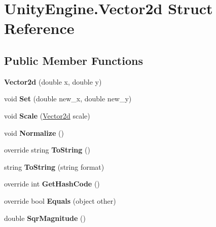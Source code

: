 \hypertarget{struct_unity_engine_1_1_vector2d}{}\section{Unity\+Engine.\+Vector2d Struct Reference}
\label{struct_unity_engine_1_1_vector2d}
\subsection*{Public Member Functions}
\begin{DoxyCompactItemize}
\item 
\mbox{\label{struct_unity_engine_1_1_vector2d_a04f770eca6bf089346578fbe02d2a85d}} 
{\bfseries Vector2d} (double x, double y)
\item 
\mbox{\label{struct_unity_engine_1_1_vector2d_a9d112a98ba6be5be962139b335bef50a}} 
void {\bfseries Set} (double new\+\_\+x, double new\+\_\+y)
\item 
\mbox{\label{struct_unity_engine_1_1_vector2d_a3cedcd488480122404c3571e151af24e}} 
void {\bfseries Scale} (\hyperlink{struct_unity_engine_1_1_vector2d}{Vector2d} scale)
\item 
\mbox{\label{struct_unity_engine_1_1_vector2d_ae1c2b2abc1d444137f3e427927919aee}} 
void {\bfseries Normalize} ()
\item 
\mbox{\label{struct_unity_engine_1_1_vector2d_a0e32225a9621ae1a91e11852b9dae864}} 
override string {\bfseries To\+String} ()
\item 
\mbox{\label{struct_unity_engine_1_1_vector2d_aaad542045077ef1699a3299a29848100}} 
string {\bfseries To\+String} (string format)
\item 
\mbox{\label{struct_unity_engine_1_1_vector2d_a936fb816c2313d3578248b643a9a1b8e}} 
override int {\bfseries Get\+Hash\+Code} ()
\item 
\mbox{\label{struct_unity_engine_1_1_vector2d_ac2d4ae49abb2a99ca46344e9bce0afcb}} 
override bool {\bfseries Equals} (object other)
\item 
\mbox{\label{struct_unity_engine_1_1_vector2d_a4fbca0566c6b1e6b1f98dad63bfe63af}} 
double {\bfseries Sqr\+Magnitude} ()
\end{DoxyCompactItemize}
